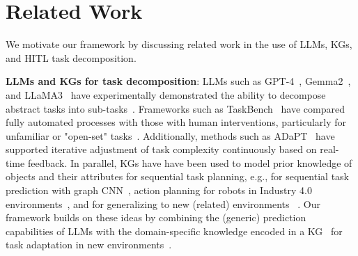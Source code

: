 \section{Related Work}
\label{sec:related-work}
We motivate our framework by discussing related work in the use of LLMs, KGs, and HITL task decomposition.

\textbf{LLMs and KGs for task decomposition}: LLMs such as GPT-4~\cite{openai2024gpt4technicalreport}, Gemma2~\cite{gemmateam2024gemma2improvingopen}, and LLaMA3~\cite{dubey2024llama3herdmodels} have experimentally demonstrated the ability to decompose abstract tasks into sub-tasks~\cite{khot2023decomposedpromptingmodularapproach, reppert2023iterateddecompositionimprovingscience, wen2024learning,li2023semantically,dery2021auxiliarytaskupdatedecomposition,liu2024deltadecomposedefficientlongterm}. Frameworks such as TaskBench~\cite{shen2023taskbench} have compared fully automated processes with those with human interventions, particularly for unfamiliar or "open-set" tasks~\cite{wang2024tdag, cui2021semantic,liu2024deltadecomposedefficientlongterm}. Additionally, methods such as ADaPT~\cite{prasad2023adapt} have supported iterative adjustment of task complexity continuously based on real-time feedback. In parallel, KGs have have been used to model prior knowledge of objects and their attributes for sequential task planning, e.g., for sequential task prediction with graph CNN~\cite{article1}, action planning for robots in Industry 4.0 environments~\cite{10.1145/3297280.3297568}, and for generalizing to new (related) environments ~\cite{9561782}. Our framework builds on these ideas by combining the (generic) prediction capabilities of LLMs with the domain-specific knowledge encoded in a KG~\cite{aburasheed2024knowledgegraphscontextsources,pan2024unifying} for task adaptation in new environments~\cite{kuang2024openfmnavopensetzeroshotobject}.


